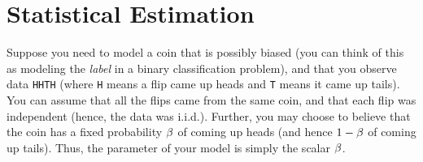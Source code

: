 
\section{Statistical Estimation}

Suppose you need to model a coin that is possibly biased (you can
think of this as modeling the \emph{label} in a binary classification
problem), and that you observe data \texttt{HHTH} (where
\texttt{H} means a flip came up heads and \texttt{T} means it came up
tails).  You can assume that all the flips came from the same coin,
and that each flip was independent (hence, the data was i.i.d.).
Further, you may choose to believe that the coin has a fixed
probability $\beta$ of coming up heads (and hence $1-\beta$ of coming up
tails).  Thus, the parameter of your model is simply the scalar $\beta$.


